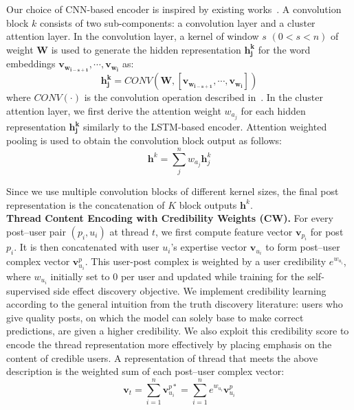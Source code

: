 \documentclass{bmcart}
\begin{document}
Our choice of CNN-based encoder is inspired by existing works~\cite{kim2014convolutional,yin2016abcnn}. A convolution block $k$ consists of two sub-components: a convolution layer and a cluster attention layer. In the convolution layer, a kernel of window $s$ $(0 < s < n)$ of weight $\boldsymbol{W}$ is used to generate the hidden representation $\boldsymbol{h^k_j}$ for the word embeddings
$\boldsymbol{v_{w_{i-s+1}}},\cdots,\boldsymbol{v_{w_i}}$ as:  
\begin{equation}
    \boldsymbol{h^k_j} = CONV(\boldsymbol{W}, [\boldsymbol{v_{w_{i-s+1}}},\cdots,\boldsymbol{v_{w_i}}])
\end{equation} 
where $CONV(\cdot)$ is the convolution operation described in~\cite{kim2014convolutional}. In the cluster attention layer, we first derive the attention weight $w_{a_j}$ for each hidden representation $\boldsymbol{h^k_j}$ similarly to the LSTM-based encoder. Attention weighted pooling is used to obtain the convolution block output as follows: 
\begin{equation}
    \boldsymbol{h}^k=\sum^n_j w_{a_j} \boldsymbol{h}^k_j
\end{equation}

Since we use multiple convolution blocks of different kernel sizes, the final post representation is the concatenation of $K$ block outputs $\boldsymbol{h}^k$. \\


\textbf{Thread Content Encoding with Credibility Weights (CW).}\label{sec:CW} For every post--user pair $\left(p_i, u_i\right)$ at thread $t$, we first compute 
feature vector $\boldsymbol{v}_{p_{i}}$ for post $p_{i}$. It is then concatenated with user $u_i$'s expertise vector $\boldsymbol{v}_{u_{i}}$
to form post--user complex vector $\boldsymbol{v}^{p}_{u_i}$. This
user-post complex is weighted by a user credibility $e^{w_{u_i}}$,
where $w_{u_i}$ initially set to 0 per user and updated while training for the self-supervised side effect discovery objective.
We implement credibility learning according to the general intuition from the truth discovery literature: users who give quality posts, on which the model can solely base to make correct predictions, are given a higher credibility. We also exploit this credibility score to encode the thread representation more effectively by placing emphasis on the content of credible users. A representation of thread that meets the above description is the weighted sum of each post--user complex vector:
\begin{equation}\label{eq:user_credibility}
\boldsymbol{v}_{t} = \sum^n_{i=1} \boldsymbol{v}^{p\ast}_{u_i} = \sum^n_{i=1} e^{w_{u_i}} \boldsymbol{v}^p_{u_i} 
\end{equation} \\
\end{document}
